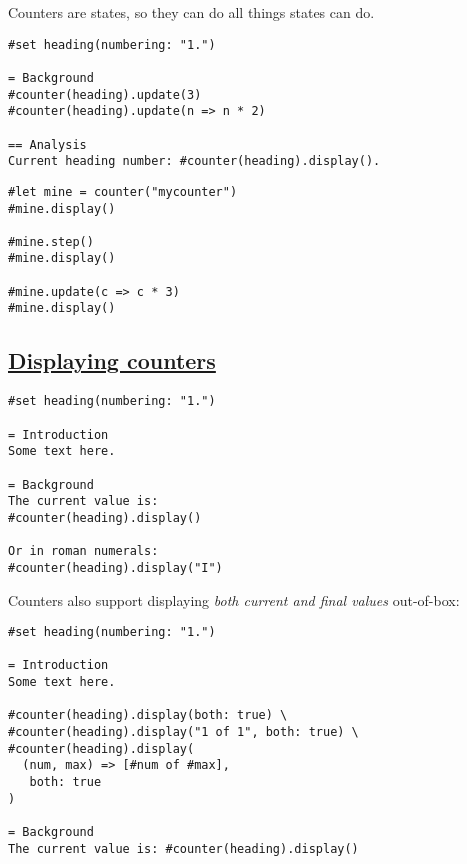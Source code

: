 Counters are states, so they can do all things states can do.

\begin{verbatim}
#set heading(numbering: "1.")

= Background
#counter(heading).update(3)
#counter(heading).update(n => n * 2)

== Analysis
Current heading number: #counter(heading).display().
\end{verbatim}

\pandocbounded{}

\begin{verbatim}
#let mine = counter("mycounter")
#mine.display()

#mine.step()
#mine.display()

#mine.update(c => c * 3)
#mine.display()
\end{verbatim}

\pandocbounded{}

\subsection{\texorpdfstring{\hyperref[displaying-counters]{Displaying
counters}}{Displaying counters}}\label{displaying-counters}

\begin{verbatim}
#set heading(numbering: "1.")

= Introduction
Some text here.

= Background
The current value is:
#counter(heading).display()

Or in roman numerals:
#counter(heading).display("I")
\end{verbatim}

\pandocbounded{}

Counters also support displaying \emph{both current and final values}
out-of-box:

\begin{verbatim}
#set heading(numbering: "1.")

= Introduction
Some text here.

#counter(heading).display(both: true) \
#counter(heading).display("1 of 1", both: true) \
#counter(heading).display(
  (num, max) => [#num of #max],
   both: true
)

= Background
The current value is: #counter(heading).display()
\end{verbatim}

